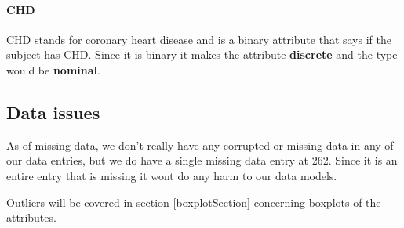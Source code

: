 \paragraph{CHD} CHD stands for coronary heart disease and is a binary attribute that says if the subject has CHD. Since it is binary it makes the attribute \textbf{discrete} and the type would be \textbf{nominal}.

\subsection{Data issues}
As of missing data, we don't really have any corrupted or missing data in any of our data entries, but we do have a single missing data entry at 262. Since it is an entire entry that is missing it wont do any harm to our data models.

Outliers will be covered in section \ref{boxplotSection} concerning boxplots of the attributes.
